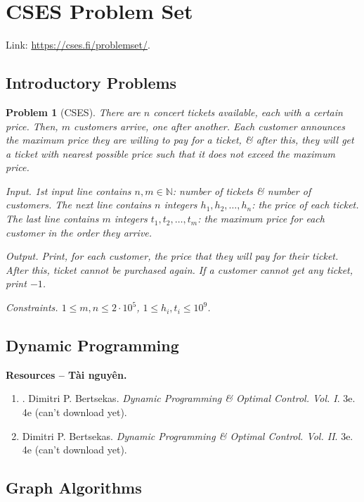 \documentclass{article}
\newtheorem{problem}{Problem}
\begin{document}

\section{CSES Problem Set}
Link: \url{https://cses.fi/problemset/}.

\subsection{Introductory Problems}

\begin{problem}[CSES]
	There are $n$ concert tickets available, each with a certain price. Then, $m$ customers arrive, one after another. Each customer announces the maximum price they are willing to pay for a ticket, \& after this, they will get a ticket with nearest possible price such that it does not exceed the maximum price.
	\item {\sf Input.} 1st input line contains $n,m\in\mathbb{N}$: number of tickets \& number of customers. The next line contains $n$ integers $h_1,h_2,\ldots,h_n$: the price of each ticket. The last line contains $m$ integers $t_1,t_2,\ldots,t_m$: the maximum price for each customer in the order they arrive.
	\item {\sf Output.} Print, for each customer, the price that they will pay for their ticket. After this, ticket cannot be purchased again. If a customer cannot get any ticket, print $-1$.
	\item {\sf Constraints.} $1\le m,n\le 2\cdot10^5$, $1\le h_i,t_i\le10^9$.
\end{problem}

\subsection{Dynamic Programming}
\textbf{\textsf{Resources -- Tài nguyên.}}
\begin{enumerate}
	\item \cite{Bertsekas2005,Bertsekas2017}. {\sc Dimitri P. Bertsekas}. {\it Dynamic Programming \& Optimal Control. Vol. I}. 3e. 4e (can't download yet).
	\item \cite{Bertsekas2007,Bertsekas2012} {\sc Dimitri P. Bertsekas}. {\it Dynamic Programming \& Optimal Control. Vol. II}. 3e. 4e (can't download yet).
\end{enumerate}

\subsection{Graph Algorithms}
\end{document}

